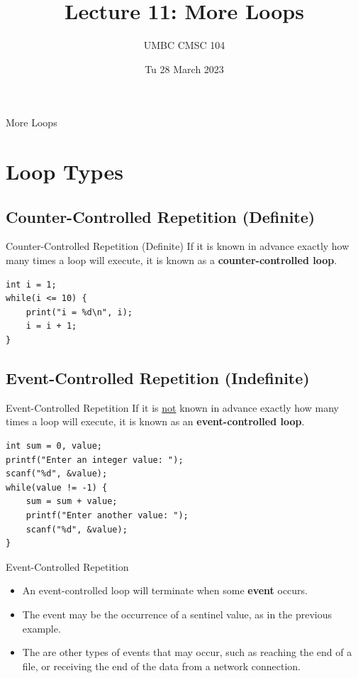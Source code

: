 \documentclass[graphics]{beamer}
\title{Lecture 11: More Loops}
\author{UMBC CMSC 104}
\date{Tu 28 March 2023}
\begin{document}
\begin{frame}{}
\centering
    More Loops
\end{frame}

\frame{\tableofcontents}

\section{Loop Types}
\subsection{Counter-Controlled Repetition (Definite)}
\begin{frame}[fragile]{Counter-Controlled Repetition (Definite)}
    If it is known in advance exactly how many times a loop will execute, it is known as a \textbf{counter-controlled loop}.
    \begin{verbatim}
int i = 1;
while(i <= 10) {
    print("i = %d\n", i);
    i = i + 1;
}
    \end{verbatim}
\end{frame}

\subsection{Event-Controlled Repetition (Indefinite)}
\begin{frame}[fragile]{Event-Controlled Repetition}
    If it is \underline{not} known in advance exactly how many times a loop will execute, it is known as an \textbf{event-controlled loop}.
    \begin{verbatim}
int sum = 0, value;
printf("Enter an integer value: ");
scanf("%d", &value);
while(value != -1) {
    sum = sum + value;
    printf("Enter another value: ");
    scanf("%d", &value);
}
    \end{verbatim}
\end{frame}

\begin{frame}{Event-Controlled Repetition}
    \begin{itemize}
        \item An event-controlled loop will terminate when some \textbf{event} occurs.
        \item The event may be the occurrence of a sentinel value, as in the previous example.
        \item The are other types of events that may occur, such as reaching the end of a file, or receiving the end of the data from a network connection.
    \end{itemize}
\end{frame}
\end{document}
